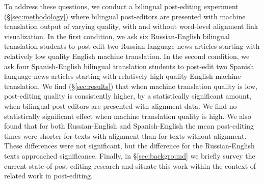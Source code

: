 To address these questions, we conduct a bilingual post-editing experiment (\S\ref{sec:methodology}) where bilingual post-editors are presented with machine translation output of varying quality, with and without word-level alignment link visualization.
%
In the first condition, we ask six Russian-English bilingual translation students to post-edit two Russian language news articles starting with relatively low quality English machine translation.
%
In the second condition, we ask four Spanish-English bilingual translation students to post-edit two Spanish language news articles starting with relatively high quality English machine translation.
%
We find (\S\ref{sec:results}) that when machine translation quality is low, post-editing quality is consistently higher, by a statistically significant amount, when bilingual post-editors are presented with alignment data.
%
We find no statistically significant effect when machine translation quality is high.
%
We also found that for both Russian-English and Spanish-English the mean post-editing times were shorter for texts with alignment than for texts without alignment. These differences were not significant, but the difference for the Russian-English texts approached significance. 
%
Finally, in \S\ref{sec:background} we briefly survey the current state of post-editing research and situate this work within the context of related work in post-editing.